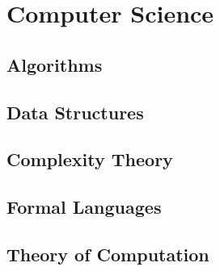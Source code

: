 \chapter{Computer Science}


\section{Algorithms}



\section{Data Structures}




\section{Complexity Theory}


\section{Formal Languages}

\section{Theory of Computation}





\begin{comment}


\end{comment}